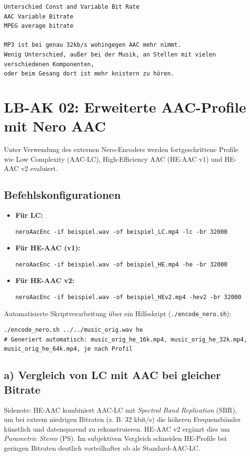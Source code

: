 \documentclass[11pt,a4paper]{article}
\begin{document}
\begin{verbatim}
Unterschied Const and Variable Bit Rate
AAC Variable Bitrate
MPEG average bitrate

MP3 ist bei genau 32kb/s wohingegen AAC mehr nimmt. 
Wenig Unterschied, außer bei der Musik, an Stellen mit vielen verschiedenen Komponenten,
oder beim Gesang dort ist mehr knistern zu hören.
\end{verbatim}



\newpage
\section{LB-AK 02: Erweiterte AAC-Profile mit Nero AAC}
Unter Verwendung des externen Nero-Encoders werden fortgeschrittene Profile wie Low Complexity (AAC-LC), High-Efficiency AAC (HE-AAC v1) und HE-AAC v2 evaluiert.

\subsection{Befehlskonfigurationen}
\begin{itemize}
        \item \textbf{Für LC:}
    \begin{lstlisting}
neroAacEnc -if beispiel.wav -of beispiel_LC.mp4 -lc -br 32000
    \end{lstlisting}
    \item \textbf{Für HE-AAC (v1):}
    \begin{lstlisting}
neroAacEnc -if beispiel.wav -of beispiel_HE.mp4 -he -br 32000
    \end{lstlisting}
    \item \textbf{Für HE-AAC v2:}
    \begin{lstlisting}
neroAacEnc -if beispiel.wav -of beispiel_HEv2.mp4 -hev2 -br 32000
    \end{lstlisting}
\end{itemize}

Automatisierte Skriptverarbeitung über ein Hilfsskript (\texttt{./encode\_nero.sh}):
\begin{lstlisting}
./encode_nero.sh ../../music_orig.wav he
# Generiert automatisch: music_orig_he_16k.mp4, music_orig_he_32k.mp4, music_orig_he_64k.mp4, je nach Profil
\end{lstlisting}

\subsection{a) Vergleich von LC mit AAC bei gleicher Bitrate}
Sidenote: HE-AAC kombiniert AAC-LC mit \textit{Spectral Band Replication} (SBR), um bei extrem niedrigen Bitraten (z. B. 32 kbit/s) die höheren Frequenzbänder künstlich und datensparend zu rekonstruieren. HE-AAC v2 ergänzt dies um \textit{Parametric Stereo} (PS). Im subjektiven Vergleich schneiden HE-Profile bei geringen Bitraten deutlich vorteilhafter ab als Standard-AAC-LC.
\end{document}
